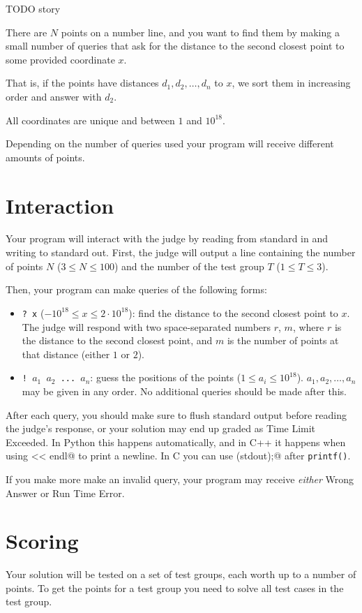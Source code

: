 TODO story

There are $N$ points on a number line, and you want to find them by making a small number of queries that ask for the distance to the second closest point to some provided coordinate $x$.

That is, if the points have distances $d_1, d_2, \ldots, d_n$ to $x$, we sort them in increasing order and answer with $d_2$.

All coordinates are unique and between $1$ and $10^{18}$.

Depending on the number of queries used your program will receive different amounts of points.

\section*{Interaction}
Your program will interact with the judge by reading from standard in and writing to standard out.
First, the judge will output a line containing the number of points $N$ ($3 \le N \le 100$) and the number of the test group $T$ ($1 \le T \le 3$).

Then, your program can make queries of the following forms:

\begin{itemize}
  \item \texttt{? x} ($-10^{18} \le x \le 2\cdot 10^{18}$): find the distance to the second closest point to $x$.
    The judge will respond with two space-separated numbers $r$, $m$,
    where $r$ is the distance to the second closest point, and $m$ is the number of points at that distance (either $1$ or $2$).
  \item \texttt{! $a_1$ $a_2$ ... $a_n$}: guess the positions of the points ($1 \le a_i \le 10^{18}$).
    $a_1, a_2, \ldots, a_n$ may be given in any order.
    No additional queries should be made after this.
\end{itemize}

After each query, you should make sure to flush standard output before reading the judge's response, or your solution may end up graded as Time Limit Exceeded.
In Python this happens automatically, and in C++ it happens when using \verb@cout << endl@ to print a newline.
In C you can use \verb@fflush(stdout);@ after \texttt{printf()}.

If you make more make an invalid query, your program may receive \emph{either} Wrong Answer or Run Time Error.

\section*{Scoring}
Your solution will be tested on a set of test groups, each worth up to a number of points.
To get the points for a test group you need to solve all test cases in the test group.

